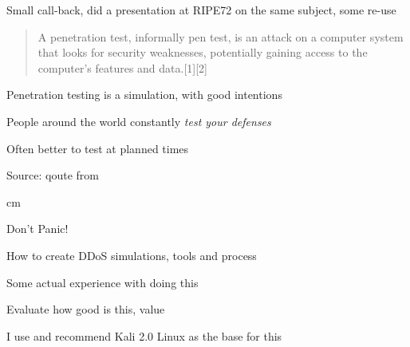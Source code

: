 \documentclass[Screen16to9,17pt]{foils}
\begin{document}


Small call-back, did a presentation at RIPE72 on the same subject, some re-use\\

\hlkprofiluk


\begin{quote}
A penetration test, informally pen test, is an attack on a computer system that looks for security weaknesses, potentially gaining access to the computer's features and data.[1][2]
\end{quote}

\begin{list1}
\item Penetration testing is a simulation, with good intentions
\item People around the world constantly \emph{test your defenses}
\item Often better to test at planned times
\end{list1}

Source: qoute from 



 cm

\centerline{\color{titlecolor}\LARGE Don't Panic!}

\begin{list1}
\item How to create DDoS simulations, tools and process
\item Some actual experience with doing this
\item Evaluate how good is this, value
\end{list1}

\vskip 1cm
\centerline{I use and recommend Kali 2.0 Linux as the base for this}



\end{document}
